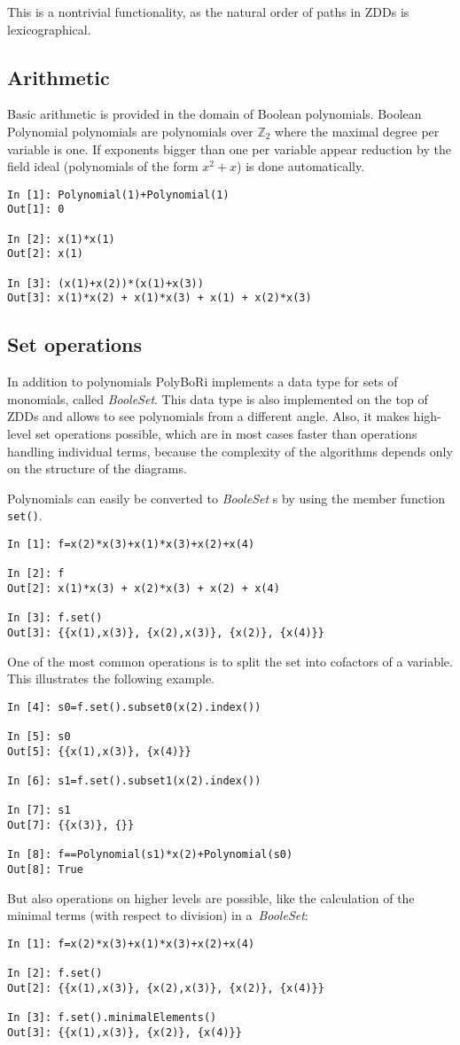 \documentclass[]{article}
\newcommand{\PolyBoRi}{{\sc PolyBoRi}\xspace}
\newcommand{\functionname}[1]{\textit{#1}\xspace}
\newcounter{thm}
\newcommand{\Ztwo}{\mathbb{Z}_2}
\begin{document}
This is a nontrivial functionality, as the natural order of paths in ZDDs is lexicographical.

\subsection{Arithmetic}
Basic arithmetic is provided in the domain of Boolean polynomials. Boolean Polynomial polynomials are polynomials over $\Ztwo$ where the maximal degree per variable is one.
If exponents bigger than one per variable appear reduction by the field ideal (polynomials of the form $x^2+x$) is done automatically.
\begin{verbatim}
In [1]: Polynomial(1)+Polynomial(1)
Out[1]: 0

In [2]: x(1)*x(1)
Out[2]: x(1)

In [3]: (x(1)+x(2))*(x(1)+x(3))
Out[3]: x(1)*x(2) + x(1)*x(3) + x(1) + x(2)*x(3)
\end{verbatim}

\subsection{Set operations}
In addition to polynomials  \PolyBoRi implements a data type for sets of monomials, called \functionname{BooleSet}.
This data type is also implemented on the top of ZDDs and allows to see
polynomials
from a different angle. Also, it makes high-level set operations possible, which are in most cases faster than operations handling individual terms, because the complexity of the algorithms depends only on the structure of the diagrams.

Polynomials can easily be converted to \functionname{BooleSet}s by using the
member function \verb|set()|.
\begin{verbatim}
In [1]: f=x(2)*x(3)+x(1)*x(3)+x(2)+x(4)

In [2]: f
Out[2]: x(1)*x(3) + x(2)*x(3) + x(2) + x(4)

In [3]: f.set()
Out[3]: {{x(1),x(3)}, {x(2),x(3)}, {x(2)}, {x(4)}}
\end{verbatim}
%
One of the most common operations is to split the set into cofactors of a
variable. This illustrates the following example.
%
\begin{verbatim}
In [4]: s0=f.set().subset0(x(2).index())

In [5]: s0
Out[5]: {{x(1),x(3)}, {x(4)}}

In [6]: s1=f.set().subset1(x(2).index())

In [7]: s1
Out[7]: {{x(3)}, {}}

In [8]: f==Polynomial(s1)*x(2)+Polynomial(s0)
Out[8]: True
\end{verbatim}
%
But also operations on higher levels are possible, like the calculation of the minimal terms (with respect to division) in a~\functionname{BooleSet}:
\begin{verbatim}
In [1]: f=x(2)*x(3)+x(1)*x(3)+x(2)+x(4)

In [2]: f.set()
Out[2]: {{x(1),x(3)}, {x(2),x(3)}, {x(2)}, {x(4)}}

In [3]: f.set().minimalElements()
Out[3]: {{x(1),x(3)}, {x(2)}, {x(4)}}
\end{verbatim}
\end{document}
